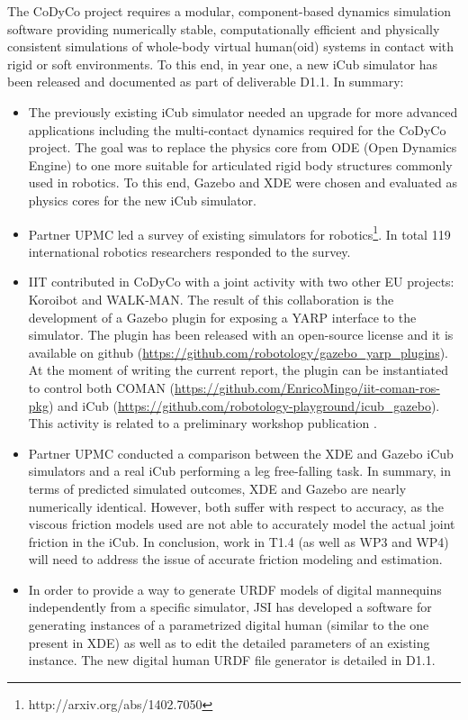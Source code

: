 \documentclass[12pt,a4paper,twoside]{article}
\begin{document}
The CoDyCo project requires a modular, component-based dynamics simulation software providing numerically stable, computationally efficient and physically consistent simulations of whole-body virtual human(oid) systems in contact with rigid or soft environments. To this end, in year one, a new iCub simulator has been released and documented as part of deliverable D1.1. In summary: 

\begin{itemize}
\item The previously existing iCub simulator needed an upgrade for more advanced applications including the multi-contact dynamics required for the CoDyCo project. The goal was to replace the physics core from ODE (Open Dynamics Engine) to one more suitable for articulated rigid body structures commonly used in robotics. To this end, Gazebo and XDE were chosen and evaluated as physics cores for the new iCub simulator. 

\item Partner UPMC led a survey of existing simulators for robotics\footnote{http://arxiv.org/abs/1402.7050}. In total 119 international robotics researchers responded to the survey.  

\item IIT contributed in CoDyCo with a joint activity with two other EU projects: Koroibot and WALK-MAN. The result of this collaboration is the development of a Gazebo plugin for exposing a YARP interface to the simulator. The plugin has been released with an open-source license and it is available on github (\url{https://github.com/robotology/gazebo_yarp_plugins}). At the moment of writing the current report, the plugin can be instantiated to control both COMAN (\url{https://github.com/EnricoMingo/iit-coman-ros-pkg}) and iCub (\url{https://github.com/robotology-playground/icub_gazebo}). This activity is related to a preliminary workshop publication \cite{Mingo2014}. 

\item Partner UPMC conducted a comparison between the XDE and Gazebo iCub simulators and a real iCub performing a leg free-falling task. In summary, in terms of predicted simulated outcomes, XDE and Gazebo are nearly numerically identical. However, both suffer with respect to accuracy, as the viscous friction models used are not able to accurately model the actual joint friction in the iCub. In conclusion, work in T1.4 (as well as WP3 and WP4) will need to address the issue of accurate friction modeling and estimation.

\item In order to provide a way to generate URDF models of digital mannequins independently from a specific simulator, JSI has developed a software for generating instances of a parametrized digital human (similar to the one present in XDE) as well as to edit the detailed parameters of an existing instance.  The new digital human URDF file generator is detailed in D1.1.
\end{itemize}
\end{document}
